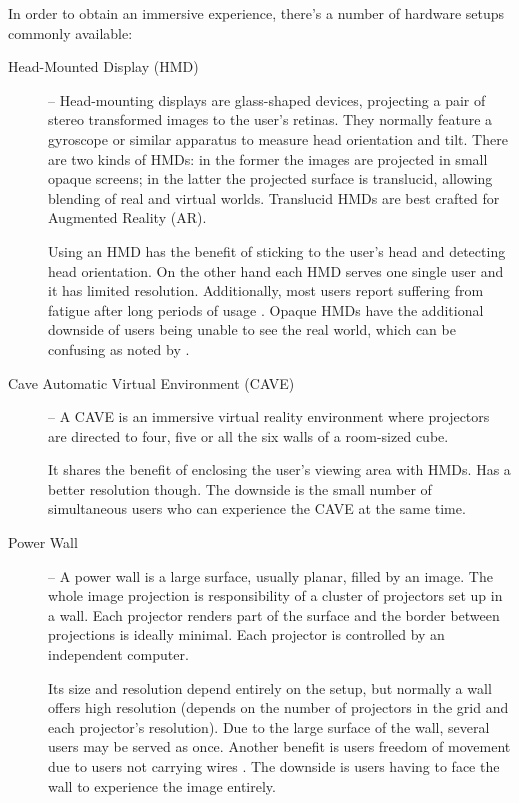 
In order to obtain an immersive experience, there's a number of hardware
setups commonly available:

\begin{description}
	\item[Head-Mounted Display (HMD)] --
	  Head-mounting displays are glass-shaped devices, projecting a pair of stereo
	  transformed images to the user's retinas.
	  They normally feature a gyroscope or similar apparatus to measure head orientation and tilt.
	  There are two kinds of HMDs: in the former the images are projected in small opaque screens;
	  in the latter the projected surface is translucid, allowing blending of real and virtual worlds.
	  Translucid HMDs are best crafted for Augmented Reality (AR).
	  
		Using an HMD has the benefit of sticking to the user's head and detecting head orientation.
		On the other hand each HMD serves one single user and it has limited resolution.
		Additionally, most users report suffering from fatigue after long periods of
		usage \cite{VREDUC}.
		Opaque HMDs have the additional downside of users being unable to see the real world, 
		which can be confusing as noted by \cite{VANDERPOL}.
			
	\item[Cave Automatic Virtual Environment (CAVE)] --
	  A CAVE is an immersive virtual reality environment where projectors are directed to four,
	  five or all the six walls of a room-sized cube.
	  
		It shares the benefit of enclosing the user's viewing area with HMDs.
		Has a better resolution though.
		The downside is the small number of simultaneous users who can experience the CAVE at the same time.
	
	\item[Power Wall] --
	  A power wall is a large surface, usually planar, filled by an image.
	  The whole image projection is responsibility of a cluster of projectors set up in a wall.
	  Each projector renders part of the surface and the border between projections is ideally minimal.
	  Each projector is controlled by an independent computer.
	  
		Its size and resolution depend entirely on the setup, but normally a wall offers high resolution
		(depends on the number of projectors in the grid and each projector's resolution).
		Due to the large surface of the wall, several users may be served as once. Another benefit
		is users freedom of movement due to users not carrying wires \cite{INTTABLE}.
		The downside is users having to face the wall to experience the image entirely.
\end{description}

